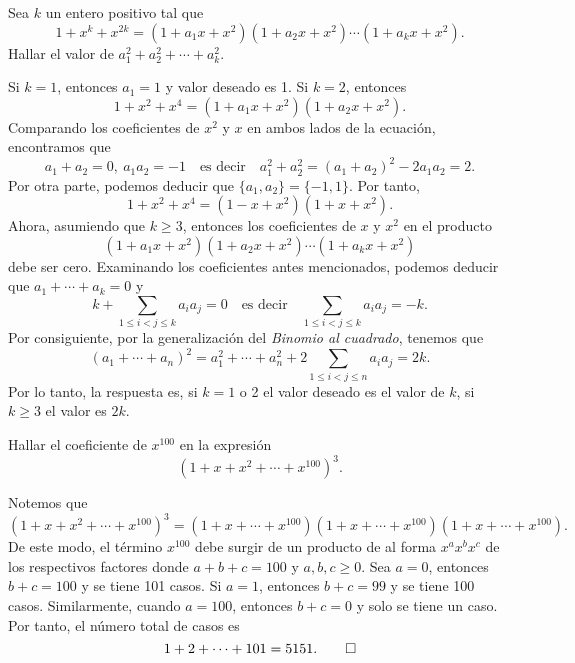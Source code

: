 \begin{example}
    Sea $k$ un entero positivo tal que
    \[
        1 + x^k + x^{2k} = (1 + a_1 x + x^2)(1 + a_2 x + x^2) \cdots (1 + a_k x + x^2).
    \]
    Hallar el valor de $a_1^2 + a_2^2 + \cdots + a_k^2$.
\end{example}
\begin{solution}
    Si $k = 1$, entonces $a_1 = 1$ y valor deseado es 1.
    Si $k = 2$, entonces
    \[
        1 + x^2 + x^4 = (1 + a_1 x + x^2)(1 + a_2 x + x^2).
    \]
    Comparando los coeficientes de $x^2$ y $x$ en ambos lados de la ecuación, encontramos que
    \[
        a_1 + a_2 = 0, \ a_1 a_2 = -1\quad \text{es decir} \quad a_1^2 + a_2^2 = (a_1 + a_2)^2 - 2a_1 a_2 = 2.
    \]
    Por otra parte, podemos deducir que $\{a_1, a_2\} = \{-1, 1\}$.
    Por tanto,
    \[
        1 + x^2 + x^4 = (1 - x + x^2)(1 + x + x^2).
    \]
    Ahora, asumiendo que $k \geq 3$, entonces los coeficientes de $x$ y $x^2$ en el producto
    \[
        (1 + a_1 x + x^2)(1 + a_2 x + x^2) \cdots (1 + a_k x + x^2)
    \]
    debe ser cero.
    Examinando los coeficientes antes mencionados, podemos deducir que
    $a_1 + \cdots + a_k = 0$ y
    \[
        k + \sum_{1 \leq i < j \leq k} a_i a_j = 0 \quad \text{es decir} \quad \sum_{1 \leq i < j \leq k} a_i a_j = -k.
    \]
    Por consiguiente, por la generalización del \textit{Binomio al cuadrado}, tenemos que
    \[
        (a_1 + \cdots + a_n)^2 = a_1^2 + \cdots + a_n^2 + 2 \sum_{1 \leq i < j \leq n} a_i a_j = 2k.
    \]
    Por lo tanto, la respuesta es, si $k = 1$ o 2 el valor deseado es el valor de $k$, si $k \geq 3$ el valor es $2k$.
\end{solution}

\begin{example}
    Hallar el coeficiente de $x^{100}$ en la expresión
    \[
        (1 + x + x^2 + \cdots + x^{100})^3.
    \]
\end{example}
\begin{solution}
    Notemos que
    \[
        (1 + x + x^2 + \cdots + x^{100})^3 = (1 + x + \cdots + x^{100})(1 + x + \cdots + x^{100})(1 + x + \cdots + x^{100}).
    \]
    De este modo, el término $x^{100}$ debe surgir de un producto de al forma $x^a x^b x^c$ de los respectivos factores donde $a + b + c = 100$ y $a,b, c \geq 0$.
    Sea $a = 0$, entonces $b + c = 100$ y se tiene 101 casos.
    Si $a = 1$, entonces $b + c = 99$ y se tiene 100 casos.
    Similarmente, cuando $a = 100$, entonces $b + c = 0$ y solo se tiene un caso.
    Por tanto, el número total de casos es
    \[
        1 + 2 + \cdots + 101 = 5151.\qedhere
    \]
\end{solution}

